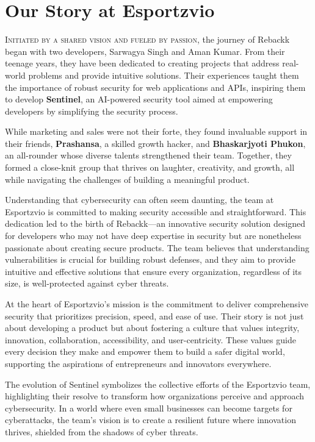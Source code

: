 \chapter{Our Story at Esportzvio}

\lettrine{I}{nitiated by a shared vision and fueled by passion}, the journey of Rebackk began with two developers, Sarwagya Singh and Aman Kumar. From their teenage years, they have been dedicated to creating projects that address real-world problems and provide intuitive solutions. Their experiences taught them the importance of robust security for web applications and APIs, inspiring them to develop \textbf{Sentinel}, an AI-powered security tool aimed at empowering developers by simplifying the security process.

While marketing and sales were not their forte, they found invaluable support in their friends, \textbf{Prashansa}, a skilled growth hacker, and \textbf{Bhaskarjyoti Phukon}, an all-rounder whose diverse talents strengthened their team. Together, they formed a close-knit group that thrives on laughter, creativity, and growth, all while navigating the challenges of building a meaningful product.

Understanding that cybersecurity can often seem daunting, the team at Esportzvio is committed to making security accessible and straightforward. This dedication led to the birth of Rebackk—an innovative security solution designed for developers who may not have deep expertise in security but are nonetheless passionate about creating secure products. The team believes that understanding vulnerabilities is crucial for building robust defenses, and they aim to provide intuitive and effective solutions that ensure every organization, regardless of its size, is well-protected against cyber threats.

At the heart of Esportzvio’s mission is the commitment to deliver comprehensive security that prioritizes precision, speed, and ease of use. Their story is not just about developing a product but about fostering a culture that values integrity, innovation, collaboration, accessibility, and user-centricity. These values guide every decision they make and empower them to build a safer digital world, supporting the aspirations of entrepreneurs and innovators everywhere.

The evolution of Sentinel symbolizes the collective efforts of the Esportzvio team, highlighting their resolve to transform how organizations perceive and approach cybersecurity. In a world where even small businesses can become targets for cyberattacks, the team’s vision is to create a resilient future where innovation thrives, shielded from the shadows of cyber threats.